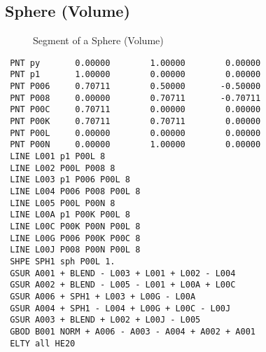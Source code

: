 \documentclass{article}
\begin{document}
\begin{appendix}
\subsection{\label{Sphere (Volume)}Sphere (Volume)}
\begin{figure}[h]
\caption{\label{Segment of a SphereV}Segment of a Sphere (Volume)}
\end{figure}
\begin{verbatim}
 PNT py       0.00000        1.00000        0.00000 
 PNT p1       1.00000        0.00000        0.00000 
 PNT P006     0.70711        0.50000       -0.50000 
 PNT P008     0.00000        0.70711       -0.70711 
 PNT P00C     0.70711        0.00000        0.00000 
 PNT P00K     0.70711        0.70711        0.00000 
 PNT P00L     0.00000        0.00000        0.00000 
 PNT P00N     0.00000        1.00000        0.00000 
 LINE L001 p1 P00L 8              
 LINE L002 P00L P008 8              
 LINE L003 p1 P006 P00L 8              
 LINE L004 P006 P008 P00L 8              
 LINE L005 P00L P00N 8              
 LINE L00A p1 P00K P00L 8              
 LINE L00C P00K P00N P00L 8              
 LINE L00G P006 P00K P00C 8              
 LINE L00J P008 P00N P00L 8              
 SHPE SPH1 sph P00L 1.
 GSUR A001 + BLEND - L003 + L001 + L002 - L004 
 GSUR A002 + BLEND - L005 - L001 + L00A + L00C 
 GSUR A006 + SPH1 + L003 + L00G - L00A 
 GSUR A004 + SPH1 - L004 + L00G + L00C - L00J 
 GSUR A003 + BLEND + L002 + L00J - L005 
 GBOD B001 NORM + A006 - A003 - A004 + A002 + A001 
 ELTY all HE20 
\end{verbatim}



\end{appendix}
\end{document}
